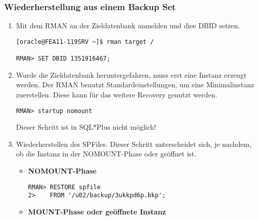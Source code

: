         \subsubsection{Wiederherstellung aus einem Backup Set}
          \begin{enumerate}
            \item Mit dem RMAN an der Zieldatenbank anmelden und diee DBID setzen.
              \begin{lstlisting}[caption={An der Zieldatenbank anmelden und die DBID setzen},label=admin1424,language=rman]
[oracle@FEA11-119SRV ~]$ rman target /

RMAN> SET DBID 1351916467;
                  \end{lstlisting}
            \item Wurde die Zieldatenbank heruntergefahren, muss erst eine Instanz erzeugt werden. Der RMAN benutzt Standardeinstellungen, um eine Minimalinstanz zuerstellen. Diese kann für das weitere Recovery genutzt werden.
              \begin{lstlisting}[caption={Zieldatenbank im RMAN in den NOMOUNT-Status bringen},label=admin1425,language=rman]
RMAN> startup nomount
              \end{lstlisting}
              \begin{merke}
                Dieser Schritt ist in SQL*Plus nicht möglich!
              \end{merke}
            \item Wiederherstellen des SPFiles. Dieser Schritt unterscheidet sich, je nachdem, ob die Instanz in der NOMOUNT-Phase oder geöffnet ist.
              \begin{itemize}
                \item \textbf{NOMOUNT-Phase}
                  \begin{lstlisting}[caption={Wiederherstellen des SPFiles in der NOMOUNT-Phase},label=admin1426,language=rman]
RMAN> RESTORE spfile
2>    FROM '/u02/backup/3ukkpd6p.bkp';
                  \end{lstlisting}
\clearpage
                \item \textbf{MOUNT-Phase oder geöffnete Instanz}


\end{itemize}
\end{enumerate}
